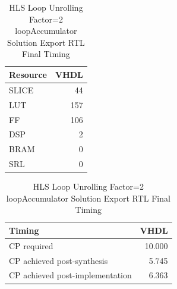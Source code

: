\begin{table}[H]
	\centering
	\begin{minipage}[t]{0.45\linewidth}
		\centering
		\begin{tabular}{|l|r|}
			\hline
			\textbf{Resource} & \textbf{VHDL} \\
			\hline
			SLICE & 44 \\
			\hline
			LUT & 157 \\
			\hline
			FF & 106 \\
			\hline
			DSP & 2 \\
			\hline
			BRAM & 0 \\
			\hline
			SRL & 0 \\
			\hline
		\end{tabular}
		\caption{HLS Loop Unrolling Factor=2 loopAccumulator Solution Export RTL Resource Usage}
		\label{tab:hls-loop-unrolling-2-loopAccumulator-solution-export-rtl-resoruce-usage}
	\end{minipage}
	\hfill
	\begin{minipage}[t]{0.45\linewidth}
		\centering
		\begin{tabular}{|l|r|}
			\hline
			\textbf{Timing} & \textbf{VHDL} \\
			\hline
			CP required & 10.000 \\
			\hline
			CP achieved post-synthesis & 5.745 \\
			\hline
			CP achieved post-implementation & 6.363 \\
			\hline
		\end{tabular}
		\caption{HLS Loop Unrolling Factor=2 loopAccumulator Solution Export RTL Final Timing}
		\label{tab:hls-loop-unrolling-2-loopAccumulator-solution-export-rtl-final-timing}
	\end{minipage}
\end{table}